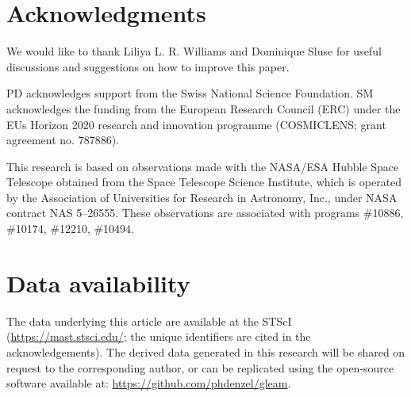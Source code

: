 \clearpage



  











\section*{Acknowledgments}

  We would like to thank Liliya L. R. Williams and Dominique Sluse for useful
  discussions and suggestions on how to improve this paper.


  PD acknowledges support from the Swiss National Science Foundation.  SM
  acknowledges the funding from the European Research Council (ERC) under the
  EUs Horizon 2020 research and innovation programme (COSMICLENS; grant
  agreement no. 787886).

  This research is based on observations made with the NASA/ESA Hubble Space
  Telescope obtained from the Space Telescope Science Institute, which is
  operated by the Association of Universities for Research in Astronomy, Inc.,
  under NASA contract NAS 5–26555. These observations are associated with
  programs \#10886, \#10174, \#12210, \#10494.

\section*{Data availability}
  The data underlying this article are available at the STScI
  (\href{https://mast.stsci.edu/}{https://mast.stsci.edu/}; the unique
  identifiers are cited in the acknowledgements).  The derived data generated in
  this research will be shared on request to the corresponding author, or can be
  replicated using the open-source software available at:
  \faGithub\;\href{https://github.com/phdenzel/gleam}{https://github.com/phdenzel/gleam}.


